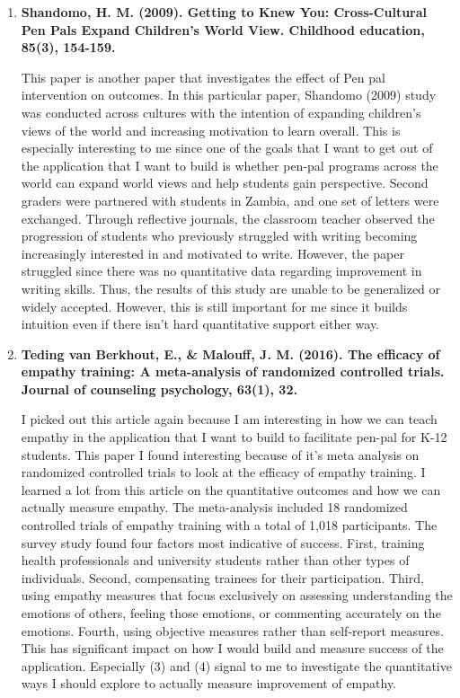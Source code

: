 \documentclass[12pt, final]{article}
\begin{document}
\begin{enumerate}
\item \textbf{Shandomo, H. M. (2009). Getting to Knew You: Cross-Cultural Pen Pals Expand Children's World View. Childhood education, 85(3), 154-159.}

This paper is another paper that investigates the effect of Pen pal intervention on outcomes. In this particular paper, Shandomo (2009) study was conducted across cultures with the
intention of expanding children’s views of the world and increasing motivation to learn overall. This is especially interesting to me since one of the goals that I want to get out of the application that I want to build is whether pen-pal programs across the world can expand world views and help students gain perspective. Second graders were partnered with students in Zambia, and one set of letters were exchanged. Through reflective journals, the classroom teacher observed the progression of students who previously struggled with writing becoming increasingly interested in and motivated to write. However, the paper struggled since there was no quantitative data regarding improvement in writing skills. Thus, the results of this study are unable to be generalized or widely accepted. However, this is still important for me since it builds intuition even if there isn't hard quantitative support either way.

\item \textbf{Teding van Berkhout, E., \& Malouff, J. M. (2016). The efficacy of empathy training: A meta-analysis of randomized controlled trials. Journal of counseling psychology, 63(1), 32.}

I picked out this article again because I am interesting in how we can teach empathy in the application that I want to build to facilitate pen-pal for K-12 students. This paper I found interesting because of it's meta analysis on randomized controlled trials to look at the efficacy of empathy training. I learned a lot from this article on the quantitative outcomes and how we can actually measure empathy. The meta-analysis included 18 randomized controlled trials of empathy training with a total of 1,018 participants. The survey study found four factors most indicative of success. First, training health professionals and university students rather than other types of individuals. Second, compensating trainees for their participation. Third, using empathy measures that focus exclusively on assessing understanding the emotions of others, feeling those emotions, or commenting accurately on the emotions. Fourth, using objective measures rather than self-report measures. This has significant impact on how I would build and measure success of the application. Especially (3) and (4) signal to me to investigate the quantitative ways I should explore to actually measure improvement of empathy. 


\end{enumerate}
\end{document}
